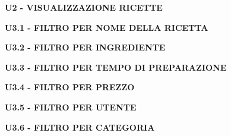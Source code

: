 \vspace{2em}

\textbf{U2 - VISUALIZZAZIONE RICETTE}



\vspace{2em}

\textbf{U3.1 - FILTRO PER NOME DELLA RICETTA}



\vspace{2em}

\textbf{U3.2 - FILTRO PER INGREDIENTE}



\vspace{2em}

\textbf{U3.3 - FILTRO PER TEMPO DI PREPARAZIONE}



\vspace{2em}

\textbf{U3.4 - FILTRO PER PREZZO}



\vspace{2em}

\textbf{U3.5 - FILTRO PER UTENTE}



\vspace{2em}

\textbf{U3.6 - FILTRO PER CATEGORIA}



\vspace{2em}

